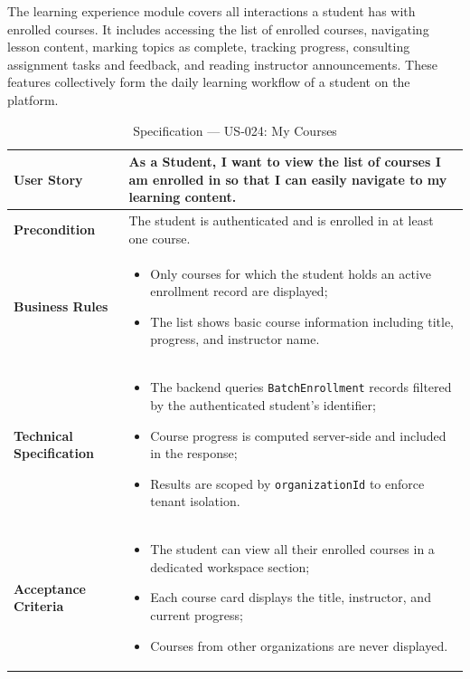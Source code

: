 The learning experience module covers all interactions a student has with enrolled
courses. It includes accessing the list of enrolled courses, navigating lesson content,
marking topics as complete, tracking progress, consulting assignment tasks and feedback,
and reading instructor announcements. These features collectively form the daily
learning workflow of a student on the platform.

\begin{table}[H]
\centering
\caption{Specification — US-024: My Courses}
\label{tab:us024}
\renewcommand{\arraystretch}{1.2}
\begin{tabularx}{\textwidth}{|p{3.5cm}|X|}
\hline
\textbf{User Story} & As a Student, I want to view the list of courses I am enrolled in so that I can easily navigate to my learning content. \\
\hline
\textbf{Precondition} & The student is authenticated and is enrolled in at least one course. \\
\hline
\textbf{Business Rules} &
\begin{itemize}[noitemsep, topsep=2pt]
  \item Only courses for which the student holds an active enrollment record are displayed;
  \item The list shows basic course information including title, progress, and instructor name.
\end{itemize} \\
\hline
\textbf{Technical Specification} &
\begin{itemize}[noitemsep, topsep=2pt]
  \item The backend queries \texttt{BatchEnrollment} records filtered by the authenticated student's identifier;
  \item Course progress is computed server-side and included in the response;
  \item Results are scoped by \texttt{organizationId} to enforce tenant isolation.
\end{itemize} \\
\hline
\textbf{Acceptance Criteria} &
\begin{itemize}[noitemsep, topsep=2pt]
  \item The student can view all their enrolled courses in a dedicated workspace section;
  \item Each course card displays the title, instructor, and current progress;
  \item Courses from other organizations are never displayed.
\end{itemize} \\
\hline
\end{tabularx}
\end{table}

